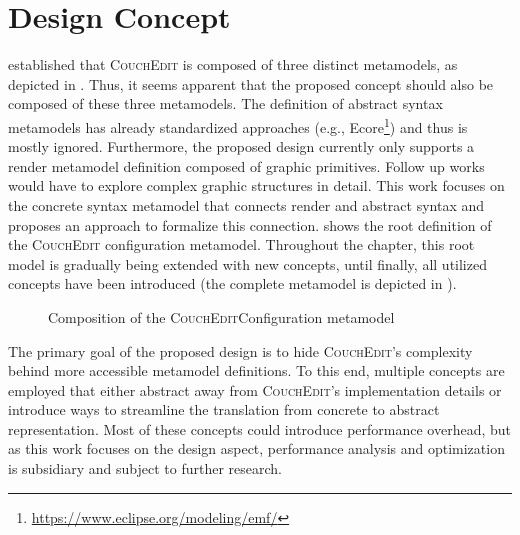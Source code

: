 \chapter{Design Concept}
\label{ch:design}
 established that \textsc{CouchEdit} is composed of three distinct metamodels, as depicted in . Thus, it seems apparent that the proposed concept should also be composed of these three metamodels. The definition of abstract syntax metamodels has already standardized approaches (e.g., Ecore\footnote{\url{https://www.eclipse.org/modeling/emf/}}) and thus is mostly ignored. Furthermore, the proposed design currently only supports a render metamodel definition composed of graphic primitives. Follow up works would have to explore complex graphic structures in detail.  This work focuses on the concrete syntax metamodel that connects render and abstract syntax and proposes an approach to formalize this connection.  shows the root definition of the \textsc{CouchEdit} configuration metamodel. Throughout the chapter, this root model is gradually being extended with new concepts, until finally, all utilized concepts have been introduced (the complete metamodel is depicted in ).

\begin{figure}[ht]
  \centering
  
  \caption{Composition of the \textsc{CouchEdit}Configuration metamodel}
  \label{fig:metamodel-base}
\end{figure}

The primary goal of the proposed design is to hide \textsc{CouchEdit}'s complexity behind more accessible metamodel definitions. To this end, multiple concepts are employed that either abstract away from \textsc{CouchEdit}'s implementation details or introduce ways to streamline the translation from concrete to abstract representation. Most of these concepts could introduce performance overhead, but as this work focuses on the design aspect, performance analysis and optimization is subsidiary and subject to further research.

